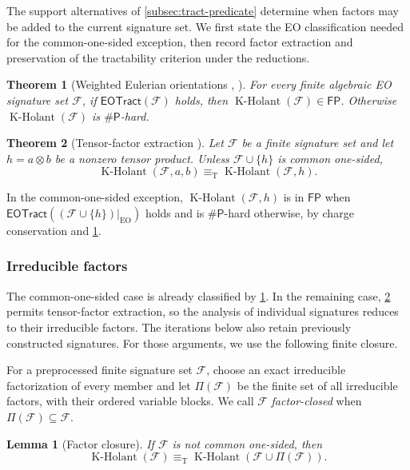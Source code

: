 \documentclass[11pt,letterpaper,onecolumn]{article}
\theoremstyle{plain}
\newtheorem{theorem}{Theorem}[section]
\newtheorem{lemma}[lemma]{Lemma}
\theoremstyle{definition}
\theoremstyle{remark}
\newcommand{\cF}{\mathcal F}
\newcommand{\KHolant}{\operatorname{K\text{-}Holant}}
\newcommand{\EOTract}{\mathsf{EOTract}}
\newcommand{\FP}{\mathsf{FP}}
\newcommand{\SharpP}{\#\mathsf P}
\newcommand{\EO}{\mathrm{EO}}
\newcommand{\equivT}{\equiv_{\mathrm T}}
\begin{document}
The support alternatives of \cref{subsec:tract-predicate} determine when
factors may be added to the current signature set.  We first state the EO
classification needed for the common-one-sided exception, then record factor
extraction and preservation of the tractability criterion under the reductions.
\begin{theorem}[Weighted Eulerian orientations
		{\cite[Theorem~26]{MengWangXia2025EO}, \cite[Theorem~1.1]{GuanShaoShi2026}}]
		\label{thm:external-eo}
		For every finite algebraic EO signature set \(\cF\), if \(\EOTract(\cF)\) holds,
		then \(\KHolant(\cF)\in\FP\). Otherwise
		\(\KHolant(\cF)\) is \(\SharpP\)-hard.
	\end{theorem}
	
	\begin{theorem}[Tensor-factor extraction
		{\cite[full version, Theorem~32 and Remark~39; conference version,
			Theorem~29]{MengWangXiaZheng2025}}]
		\label{thm:external-factor}
		Let \(\cF\) be a finite signature set and let
		\(h=a\otimes b\) be a nonzero tensor product.  Unless
		\(\cF\cup\{h\}\) is common one-sided,
		\[
		\KHolant(\cF,a,b)\equivT\KHolant(\cF,h).
		\]
	\end{theorem}

In the common-one-sided exception, \(\KHolant(\cF,h)\) is in \(\FP\)
		when \(\EOTract((\cF\cup\{h\})|_{\EO})\) holds and is
		\(\SharpP\)-hard otherwise, by charge conservation and
		\cref{thm:external-eo}.
	
	\subsubsection{Irreducible factors}
	\label{subsec:factor-saturation}

The common-one-sided case is already classified by \cref{thm:external-eo}.
In the remaining case, \cref{thm:external-factor} permits tensor-factor
extraction, so the analysis of individual signatures reduces to their
irreducible factors.  The iterations below also retain previously
constructed signatures.  For those arguments, we use the following finite
closure.
	
	For a preprocessed finite signature set \(\cF\), choose an exact
	irreducible factorization of every member and let \(\Pi(\cF)\) be the
	finite set of all irreducible factors, with their ordered variable blocks.  We call
	\(\cF\) \emph{factor-closed} when \(\Pi(\cF)\subseteq\cF\).
	
	\begin{lemma}[Factor closure]
		\label{lem:factor-saturation}
		If \(\cF\) is not common one-sided, then
		\begin{equation}
			\KHolant(\cF)
			\equivT
			\KHolant(\cF\cup\Pi(\cF)).
			\label{eq:factor-saturation}
		\end{equation}
	\end{lemma}
	
\end{document}
